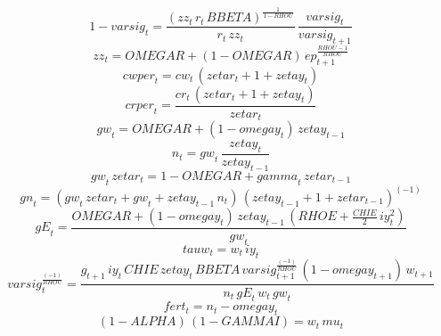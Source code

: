 \begin{dmath}
1-{varsig}_{t}=\frac{\left({zz}_{t}\, {r}_{t}\, {BBETA}\right)^{\frac{1}{1-{RHOU}}}}{{r}_{t}\, {zz}_{t}}\, \frac{{varsig}_{t}}{{varsig}_{t+1}}
\end{dmath}
\begin{dmath}
{zz}_{t}={OMEGAR}+\left(1-{OMEGAR}\right)\, {ep}_{t+1}^{\frac{{RHOU}-1}{{RHOU}}}
\end{dmath}
\begin{dmath}
{cwper}_{t}={cw}_{t}\, \left({zetar}_{t}+1+{zetay}_{t}\right)
\end{dmath}
\begin{dmath}
{crper}_{t}=\frac{{cr}_{t}\, \left({zetar}_{t}+1+{zetay}_{t}\right)}{{zetar}_{t}}
\end{dmath}
\begin{dmath}
{gw}_{t}={OMEGAR}+\left(1-{omegay}_{t}\right)\, {zetay}_{t-1}
\end{dmath}
\begin{dmath}
{n}_{t}={gw}_{t}\, \frac{{zetay}_{t}}{{zetay}_{t-1}}
\end{dmath}
\begin{dmath}
{gw}_{t}\, {zetar}_{t}=1-{OMEGAR}+{gamma}_{t}\, {zetar}_{t-1}
\end{dmath}
\begin{dmath}
{gn}_{t}=\left({gw}_{t}\, {zetar}_{t}+{gw}_{t}+{zetay}_{t-1}\, {n}_{t}\right)\, \left({zetay}_{t-1}+1+{zetar}_{t-1}\right)^{\left(-1\right)}
\end{dmath}
\begin{dmath}
{gE}_{t}=\frac{{OMEGAR}+\left(1-{omegay}_{t}\right)\, {zetay}_{t-1}\, \left({RHOE}+\frac{{CHIE}}{2}\, {iy}_{t}^{2}\right)}{{gw}_{t}}
\end{dmath}
\begin{dmath}
{tauw}_{t}={w}_{t}\, {iy}_{t}
\end{dmath}
\begin{dmath}
{varsig}_{t}^{\frac{\left(-1\right)}{{RHOU}}}=\frac{{g}_{t+1}\, {iy}_{t}\, {CHIE}\, {zetay}_{t}\, {BBETA}\, {varsig}_{t+1}^{\frac{\left(-1\right)}{{RHOU}}}\, \left(1-{omegay}_{t+1}\right)\, {w}_{t+1}}{{n}_{t}\, {gE}_{t}\, {w}_{t}\, {gw}_{t}}
\end{dmath}
\begin{dmath}
{fert}_{t}={n}_{t}-{omegay}_{t}
\end{dmath}
\begin{dmath}
\left(1-{ALPHA}\right)\, \left(1-{GAMMAI}\right)={w}_{t}\, {mu}_{t}
\end{dmath}

